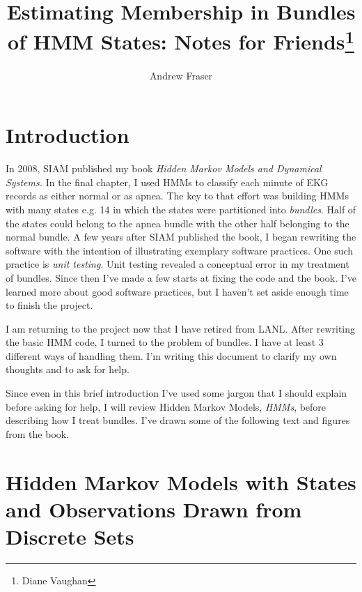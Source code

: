 \documentclass[]{article}
\title{Estimating Membership in Bundles of HMM States: Notes for
  Friends\footnote{Diane Vaughan}}
\author{Andrew Fraser}
\newcommand{\eg}{e.g.\xspace}
\begin{document}
\maketitle

\section{Introduction}
\label{sec:introduction}

In 2008, SIAM published my book \emph{Hidden Markov Models and
  Dynamical Systems.}  In the final chapter, I used HMMs to classify
each minute of EKG records as either normal or as apnea.  The key to
that effort was building HMMs with many states \eg 14 in which the
states were partitioned into \emph{bundles}.  Half of the states could
belong to the apnea bundle with the other half belonging to the normal
bundle.  A few years after SIAM published the book, I began rewriting
the software with the intention of illustrating exemplary software
practices.  One such practice is \emph{unit testing}.  Unit testing
revealed a conceptual error in my treatment of bundles.  Since then
I've made a few starts at fixing the code and the book.  I've learned
more about good software practices, but I haven't set aside enough
time to finish the project.

I am returning to the project now that I have retired from LANL.
After rewriting the basic HMM code, I turned to the problem of
bundles.  I have at least 3 different ways of handling them.  I'm
writing this document to clarify my own thoughts and to ask for help.

Since even in this brief introduction I've used some jargon that I
should explain before asking for help, I will review Hidden Markov
Models, \emph{HMMs}, before describing how I treat bundles.  I've
drawn some of the following text and figures from the book.

\section{Hidden Markov Models with States and Observations Drawn from
  Discrete Sets}
\label{sec:hmms}
\end{document}
